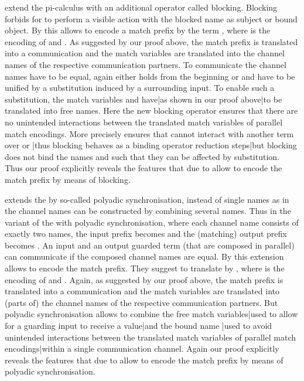 \documentclass[final,copyright,creativecommons]{eptcs}
\begin{document}
\cite{vivas} extend the pi-calculus with an additional operator  called blocking. Blocking forbids for  to perform a visible action with the blocked name  as subject or bound object. By \cite{vivas} this allows to encode a match prefix  by the term , where  is the encoding of  and . As suggested by our proof above, the match prefix is translated into a communication and the match variables are translated into the channel names of the respective communication partners. To communicate the channel names have to be equal, \ie again either  holds from the beginning or  and  have to be unified by a substitution induced by a surrounding input. To enable such a substitution, the match variables  and  {have}|{as} shown in our proof {above}|{to} be translated into free names. Here the new blocking operator ensures that there are no unintended interactions between the translated match variables of parallel match encodings. More precisely  ensures that  cannot interact with another term over  or |{thus} blocking behaves as a binding operator \wrt reduction {steps}|{but} blocking does not bind the names  and  such that they can be affected by substitution.
Thus our proof explicitly reveals the features that due to \cite{vivas} allow to encode the match prefix by means of blocking.

\cite{carbone} extends the \piCal by so-called polyadic synchronisation, \ie instead of single names as in the \piCal channel names can be constructed by combining several names. Thus \eg in the variant of the \piCal with polyadic synchronisation, where each channel name consists of exactly two names, the input prefix becomes  and the (matching) output prefix becomes . An input and an output guarded term (that are composed in parallel) can communicate if the composed channel names are equal. By \cite{carbone} this extension allows to encode the match prefix. They suggest to translate  by , where  is the encoding of  and . Again, as suggested by our proof above, the match prefix is translated into a communication and the match variables are translated into (parts of) the channel names of the respective communication partners. But polyadic synchronisation allows to combine the free match {variables}|{used} to allow for a guarding input to receive a {value}|{and} the bound name |{used} to avoid unintended interactions between the translated match variables of parallel match {encodings}|{within} a single communication channel.
Again our proof explicitly reveals the features that due to \cite{carbone} allow to encode the match prefix by means of polyadic synchronisation.
\end{document}

